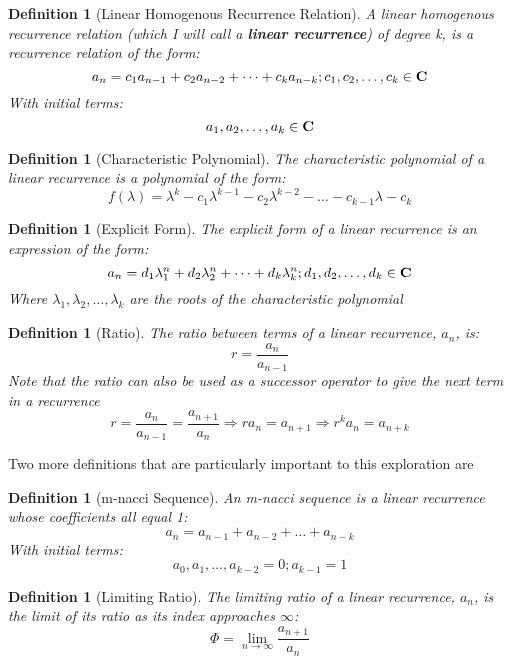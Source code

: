 \documentclass[11pt]{article}
\newtheorem{definition}[theorem]{Definition}
\begin{document}
\begin{definition}[Linear Homogenous Recurrence Relation] A linear homogenous recurrence relation (which I will call a \textbf{linear recurrence}) of degree \mbox{k}, is a recurrence relation of the form:
    $$a_n=c_1a_{n-1}+c_2a_{n-2}+\dots +c_ka_{n-k}; c_1,c_2,\dots,c_k\in \mbox{\textbf{C}}$$ 
    With initial terms: 
    $$a_1,a_2,\dots,a_k\in\mbox{\textbf{C}}$$
\end{definition}

\begin{definition}[Characteristic Polynomial] The characteristic polynomial of a linear recurrence is a polynomial of the form:
    $$f(\lambda) = \lambda^{k}-c_1\lambda^{k-1}-c_2\lambda^{k-2}-\dots-c_{k-1}\lambda-c_k$$ 
\end{definition}

\begin{definition}[Explicit Form] The explicit form of a linear recurrence is an expression of the form:
    $$a_n=d_1\lambda_1^n+d_2\lambda_2^n+\dots+d_k\lambda_k^n; d_1,d_2,\dots,d_k \in\mbox{\textbf{C}}$$ 
    Where \mbox{$\lambda_1,\lambda_2,\dots,\lambda_k$} are the roots of the characteristic polynomial
\end{definition}

\begin{definition}[Ratio] The ratio between terms of a linear recurrence, $a_n$, is:
    $$r=\frac{a_n}{a_{n-1}}$$
    Note that the ratio can also be used as a successor operator to give the next term in a recurrence 
    $$r=\frac{a_n}{a_{n-1}}=\frac{a_{n+1}}{a_{n}}\Rightarrow r a_n=a_{n+1}\Rightarrow r^k a_n=a_{n+k}$$
\end{definition}

Two more definitions that are particularly important to this exploration are 
\begin{definition}[m-nacci Sequence] An m-nacci sequence is a linear recurrence whose coefficients all equal 1:
    $$a_n=a_{n-1}+a_{n-2}+\dots +a_{n-k}$$ 
    With initial terms: 
    $$a_0,a_1,\dots,a_{k-2}=0;a_{k-1}=1$$
\end{definition}

\begin{definition}[Limiting Ratio] The limiting ratio of a linear recurrence, $a_n$, is the limit of its ratio as its index approaches $\infty$:
    $$\Phi=\lim_{n\to\infty}\frac{a_{n+1}}{a_{n}}$$
\end{definition}
\end{document}
